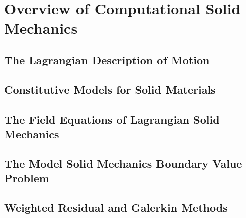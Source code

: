 \chapter{Overview of Computational Solid Mechanics}

\section{The Lagrangian Description of Motion} %


\section{Constitutive Models for Solid Materials} %


\section{The Field Equations of Lagrangian Solid Mechanics} %


\section{The Model Solid Mechanics Boundary Value Problem} %


\section{Weighted Residual and Galerkin Methods} %

